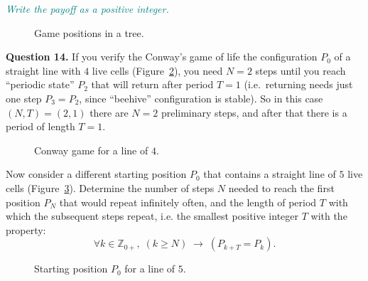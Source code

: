 \documentclass[jou]{apa6}
\begin{document}
\textcolor{teal}{\em Write the payoff as a positive integer.}

\begin{figure}[!htb]
\caption{\label{fig:minimax} Game positions in a tree.}
\end{figure}


\vspace{10pt} 
{\bf Question 14.} If you verify the Conway's game of life the configuration $P_0$ 
of a straight line with $4$ live cells (Figure~\ref{fig:conway}), 
you need $N = 2$ steps until you reach ``periodic state'' $P_2$ that will 
return after period $T = 1$ (i.e.\ returning needs just one step $P_3 = P_2$, 
since ``beehive'' configuration is stable). So in this case $(N,T)=(2,1)$ \textendash{}
there are $N=2$ preliminary steps, and after that there is a period of length $T=1$. 

\begin{figure}[!htb]
\caption{\label{fig:conway} Conway game for a line of $4$.}
\end{figure}

Now consider a different starting position $P_0$ that contains a straight line 
of $5$ live cells (Figure~\ref{fig:conway2}). Determine the number of steps $N$ needed
to reach the first position $P_N$ that would repeat infinitely often, and
the length of period $T$ with which the subsequent steps repeat, i.e. 
the smallest positive integer $T$ with the property:
$$\forall k \in \mathbb{Z}_{0+},\;(k \geq N)\;\rightarrow\; (P_{k+T} = P_k).$$

\begin{figure}[!htb]
\caption{\label{fig:conway2} Starting position $P_0$ for a line of $5$.}
\end{figure}
\end{document}
